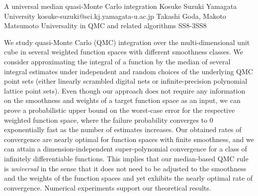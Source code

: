 \begin{talk}
  {A universal median quasi-Monte Carlo integration}%
  {Kosuke Suzuki}%
  {Yamagata University}%
  {kosuke-suzuki@sci.kj.yamagata-u.ac.jp}%
  {Takashi Goda, Makoto Matsumoto}%
{Universality in QMC and related algorithms}
{}{SS8-3}{SS8}


We study quasi-Monte Carlo (QMC) integration over the multi-dimensional unit cube in several weighted function spaces with different smoothness classes.
We consider approximating the integral of a function by the median of several integral estimates under independent and random choices of the underlying QMC point sets (either linearly scrambled digital nets or infinite-precision polynomial lattice point sets).
Even though our approach does not require any information on the smoothness and weights of a target function space as an input, we can prove a probabilistic upper bound on the worst-case error for the respective weighted function space, where the failure probability converges to 0 exponentially fast as the number of estimates increases.
Our obtained rates of convergence are nearly optimal for function spaces with finite smoothness, and we can attain a dimension-independent super-polynomial convergence for a class of infinitely differentiable functions.
This implies that our median-based QMC rule is \emph{universal} in the sense that it does not need to be adjusted to the smoothness and the weights of the function spaces and yet exhibits the nearly optimal rate of convergence. Numerical experiments support our theoretical results.
\end{talk}

